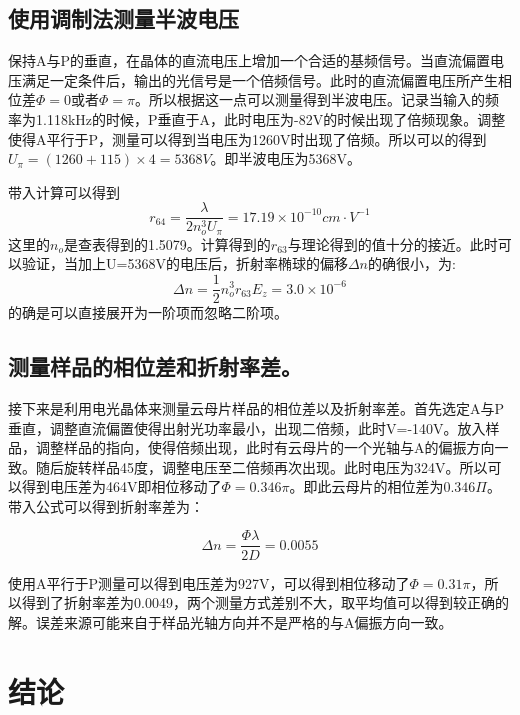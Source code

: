 \documentclass[aps,pre,12pt,preprint,onecolumn,showpacs,showkeys,UTF8]{revtex4-1}
\begin{document}
\subsection{使用调制法测量半波电压}

保持A与P的垂直，在晶体的直流电压上增加一个合适的基频信号。当直流偏置电压满足一定条件后，输出的光信号是一个倍频信号。此时的直流偏置电压所产生相位差$\Phi=0$或者$\Phi=\pi$。所以根据这一点可以测量得到半波电压。记录当输入的频率为1.118kHz的时候，P垂直于A，此时电压为-82V的时候出现了倍频现象。调整使得A平行于P，测量可以得到当电压为1260V时出现了倍频。所以可以的得到$U_\pi=(1260+115)\times4=5368V$。即半波电压为5368V。

带入计算可以得到
\begin{equation}
	r_{64}=\frac{\lambda}{2n_o^3U_\pi}=17.19\times10^{-10} cm \cdot V^{-1}
\end{equation}
这里的$n_o$是查表得到的1.5079。计算得到的$r_{63}$与理论得到的值十分的接近。此时可以验证，当加上U=5368V的电压后，折射率椭球的偏移$\Delta n$的确很小，为:
\begin{equation}
	\Delta n=\frac{1}{2}n_o^3r_{63}E_z=3.0\times10^{-6}
\end{equation}
的确是可以直接展开为一阶项而忽略二阶项。

\subsection{测量样品的相位差和折射率差。}

接下来是利用电光晶体来测量云母片样品的相位差以及折射率差。首先选定A与P垂直，调整直流偏置使得出射光功率最小，出现二倍频，此时V=-140V。放入样品，调整样品的指向，使得倍频出现，此时有云母片的一个光轴与A的偏振方向一致。随后旋转样品45度，调整电压至二倍频再次出现。此时电压为324V。所以可以得到电压差为464V即相位移动了$\Phi=0.346\pi$。即此云母片的相位差为$0.346\Pi$。带入公式可以得到折射率差为：

\begin{equation}
	\Delta n = \frac{\Phi \lambda}{2 D} = 0.0055
\end{equation}

使用A平行于P测量可以得到电压差为927V，可以得到相位移动了$\Phi=0.31\pi$，所以得到了折射率差为0.0049，两个测量方式差别不大，取平均值可以得到较正确的解。误差来源可能来自于样品光轴方向并不是严格的与A偏振方向一致。

\section{结论}
\end{document}

